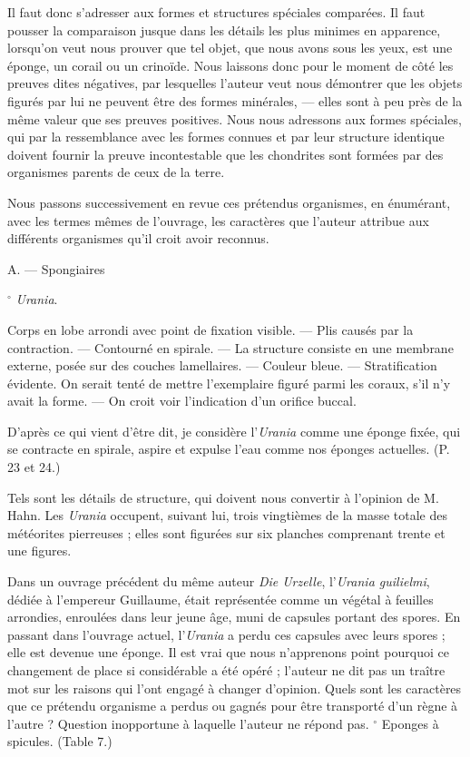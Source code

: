 \documentclass[a4paper, 12pt, oneside, french]{article}
\begin{document}
Il faut donc s'adresser aux formes et structures spéciales comparées. Il faut pousser la comparaison jusque dans les détails les plus minimes en apparence, lorsqu'on veut nous prouver que tel objet, que nous avons sous les yeux, est une éponge, un corail ou un crinoïde. Nous laissons donc pour le moment de côté les preuves dites négatives, par lesquelles l'auteur veut nous démontrer que les objets figurés par lui ne peuvent être des formes minérales, --- elles sont à peu près de la même valeur que ses preuves positives. Nous nous adressons aux formes spéciales, qui par la ressemblance avec les formes connues et par leur structure identique doivent fournir la preuve incontestable que les chondrites sont formées par des organismes parents de ceux de la terre.

Nous passons successivement en revue ces prétendus organismes, en énumérant, avec les termes mêmes de l'ouvrage, les caractères que l'auteur attribue aux différents organismes qu'il croit avoir reconnus.

\og A. --- Spongiaires \fg

$^{\circ}$ \emph{Urania}. \fg

\og Corps en lobe arrondi avec point de fixation visible. \fg --- \og Plis causés par la contraction. \fg --- \og Contourné en spirale. \fg --- \og La structure consiste en une membrane externe, posée sur des couches lamellaires. \fg --- \og Couleur bleue. \fg --- \og Stratification évidente. On serait tenté de mettre l'exemplaire figuré parmi les coraux, s'il n'y avait la forme. \fg --- \og On croit voir l'indication d'un orifice buccal. \fg

\og D'après ce qui vient d'être dit, je considère l'\emph{Urania} comme une éponge fixée, qui se contracte en spirale, aspire et expulse l'eau comme nos éponges actuelles. \fg (P. 23 et 24.)

Tels sont les détails de structure, qui doivent nous convertir à l'opinion de M. Hahn. Les \emph{Urania} occupent, suivant lui, trois vingtièmes de la masse totale des météorites pierreuses ; elles sont figurées sur six planches comprenant trente et une figures.

Dans un ouvrage précédent du même auteur \emph{Die Urzelle}, l'\emph{Urania guilielmi}, dédiée à l'empereur Guillaume, était représentée comme un végétal à feuilles arrondies, enroulées dans leur jeune âge, muni de capsules portant des spores. En passant dans l'ouvrage actuel, l'\emph{Urania} a perdu ces capsules avec leurs spores ; elle est devenue une éponge. Il est vrai que nous n'apprenons point pourquoi ce changement de place si considérable a été opéré ; l'auteur ne dit pas un traître mot sur les raisons qui l'ont engagé à changer d'opinion. Quels sont les caractères que ce prétendu organisme a perdus ou gagnés pour être transporté d'un règne à l'autre ? Question inopportune à laquelle l'auteur ne répond pas.
$^{\circ}$ Eponges à spicules. \fg (Table 7.)
\end{document}
